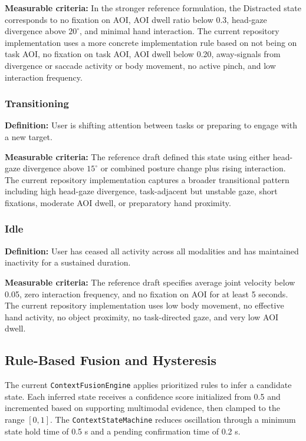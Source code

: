 \documentclass[10pt,twocolumn]{article}
\begin{document}
\textbf{Measurable criteria:} In the stronger reference formulation, the Distracted state corresponds to no fixation on AOI, AOI dwell ratio below 0.3, head-gaze divergence above \(20^\circ\), and minimal hand interaction. The current repository implementation uses a more concrete implementation rule based on not being on task AOI, no fixation on task AOI, AOI dwell below 0.20, away-signals from divergence or saccade activity or body movement, no active pinch, and low interaction frequency.

\subsubsection{Transitioning}
\textbf{Definition:} User is shifting attention between tasks or preparing to engage with a new target.

\textbf{Measurable criteria:} The reference draft defined this state using either head-gaze divergence above \(15^\circ\) or combined posture change plus rising interaction. The current repository implementation captures a broader transitional pattern including high head-gaze divergence, task-adjacent but unstable gaze, short fixations, moderate AOI dwell, or preparatory hand proximity.

\subsubsection{Idle}
\textbf{Definition:} User has ceased all activity across all modalities and has maintained inactivity for a sustained duration.

\textbf{Measurable criteria:} The reference draft specifies average joint velocity below 0.05, zero interaction frequency, and no fixation on AOI for at least 5 seconds. The current repository implementation uses low body movement, no effective hand activity, no object proximity, no task-directed gaze, and very low AOI dwell.

\subsection{Rule-Based Fusion and Hysteresis}
The current \texttt{ContextFusionEngine} applies prioritized rules to infer a candidate state. Each inferred state receives a confidence score initialized from 0.5 and incremented based on supporting multimodal evidence, then clamped to the range \([0,1]\). The \texttt{ContextStateMachine} reduces oscillation through a minimum state hold time of 0.5 s and a pending confirmation time of 0.2 s.
\end{document}
